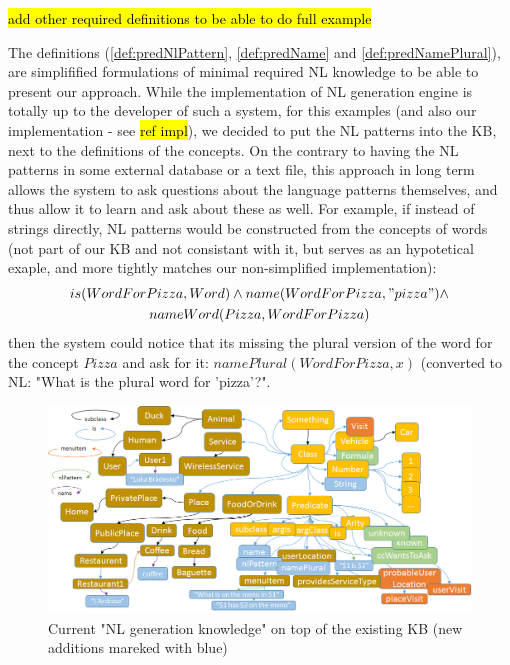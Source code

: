 \hl{add other required definitions to be able to do full example}

The definitions (\autoref{def:predNlPattern}, \autoref{def:predName} and
\autoref{def:predNamePlural}),
are simplifified formulations of minimal required NL knowledge to be able to 
present our approach. While the implementation of NL generation engine is 
totally up to the developer of such a system, for this examples (and also 
our implementation - see \hl{ref impl}), we decided to put the NL patterns
into the KB, next to the definitions of the concepts. On the contrary to
having the NL patterns in some external database or a text file, this approach
in long term allows the system to ask questions about the language patterns
themselves, and thus allow it to learn and ask about these as well. For example,
if instead of strings directly, NL patterns would be constructed from the 
concepts of words (not part of our KB and not consistant with it, but serves 
as an hypotetical exaple, and more tightly matches our non-simplified 
implementation):
\begin{equation*}
\begin{gathered}
is(WordForPizza, Word) \land name(WordForPizza, "pizza")\land\\
nameWord(Pizza,WordForPizza)
\end{gathered}
\end{equation*}
then the system could notice that its missing the plural version of the word
for the concept $Pizza$ and ask for it: $namePlural(WordForPizza,x)$ 
(converted to NL: "What is the plural word for 'pizza'?".

\begin{figure}[H]
	\centering
		\includegraphics[width=1\textwidth]{figures/LogicToNLOntology.png}
	\caption{Current "NL generation knowledge" on top of the existing KB (new
    additions mareked with blue)}
	\label{fig:nlKB}
\end{figure}

